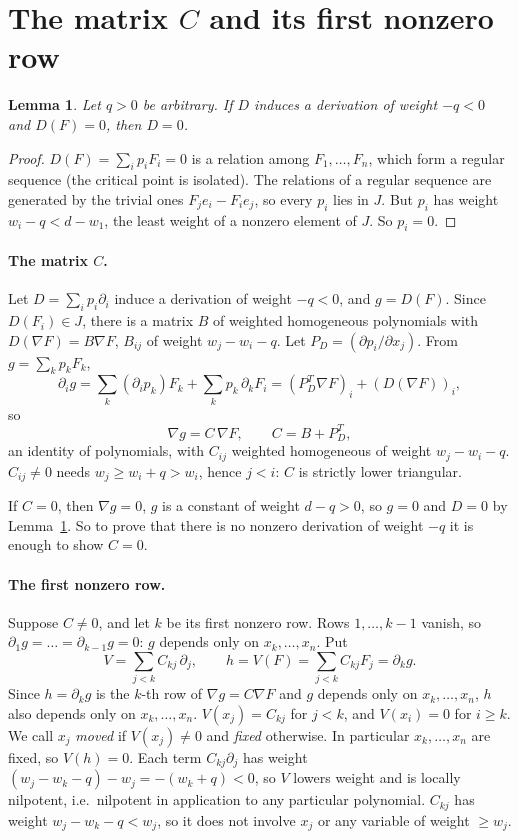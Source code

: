 \documentclass[11pt]{article}
\newtheorem{lemma}[theorem]{Lemma}
\theoremstyle{remark}
\begin{document}
\section{The matrix $C$ and its first nonzero row}

\begin{lemma}\label{lem:A}
Let $q>0$ be arbitrary. If $D$ induces a derivation of weight $-q<0$ and $D(F)=0$, then $D=0$.
\end{lemma}

\begin{proof}
$D(F)=\sum_ip_iF_i=0$ is a relation among $F_1,\dots,F_n$, which form a regular sequence (the critical point is isolated). The relations of a regular sequence are generated by the trivial ones $F_je_i-F_ie_j$, so every $p_i$ lies in $J$. But $p_i$ has weight $w_i-q<d-w_1$, the least weight of a nonzero element of $J$. So $p_i=0$.
\end{proof}

\paragraph{The matrix $C$.} Let $D=\sum_ip_i\partial_i$ induce a derivation of weight $-q<0$, and $g=D(F)$. Since $D(F_i)\in J$, there is a matrix $B$ of weighted homogeneous polynomials with $D(\nabla F)=B\nabla F$, $B_{ij}$ of weight $w_j-w_i-q$. Let $P_D=(\partial p_i/\partial x_j)$. From $g=\sum_kp_kF_k$,
\[
\partial_ig=\sum_k(\partial_ip_k)F_k+\sum_kp_k\,\partial_kF_i=(P_D^T\nabla F)_i+(D(\nabla F))_i,
\]
so
\[
\nabla g=C\,\nabla F,\qquad C=B+P_D^T,
\]
an identity of polynomials, with $C_{ij}$ weighted homogeneous of weight $w_j-w_i-q$. $C_{ij}\ne0$ needs $w_j\ge w_i+q>w_i$, hence $j<i$: $C$ is strictly lower triangular.

If $C=0$, then $\nabla g=0$, $g$ is a constant of weight $d-q>0$, so $g=0$ and $D=0$ by Lemma~\ref{lem:A}. So to prove that there is no nonzero derivation of weight $-q$ it is enough to show $C=0$.

\paragraph{The first nonzero row.} Suppose $C\ne0$, and let $k$ be its first nonzero row. Rows $1,\dots,k-1$ vanish, so $\partial_1g=\dots=\partial_{k-1}g=0$: $g$ depends only on $x_k,\dots,x_n$. Put
\[
V=\sum_{j<k}C_{kj}\,\partial_j,\qquad h=V(F)=\sum_{j<k}C_{kj}F_j=\partial_kg .
\]
Since $h=\partial_kg$ is the $k$-th row of $\nabla g=C\nabla F$ and $g$ depends only on $x_k,\dots,x_n$, $h$ also depends only on $x_k,\dots,x_n$. $V(x_j)=C_{kj}$ for $j<k$, and $V(x_i)=0$ for $i\ge k$. We call $x_j$ \emph{moved} if $V(x_j)\ne0$ and \emph{fixed} otherwise. In particular $x_k,\dots,x_n$ are fixed, so $V(h)=0$. Each term $C_{kj}\partial_j$ has weight $(w_j-w_k-q)-w_j=-(w_k+q)<0$, so $V$ lowers weight and is locally nilpotent, i.e.\ nilpotent in application to any particular polynomial. $C_{kj}$ has weight $w_j-w_k-q<w_j$, so it does not involve $x_j$ or any variable of weight $\ge w_j$.
\end{document}
